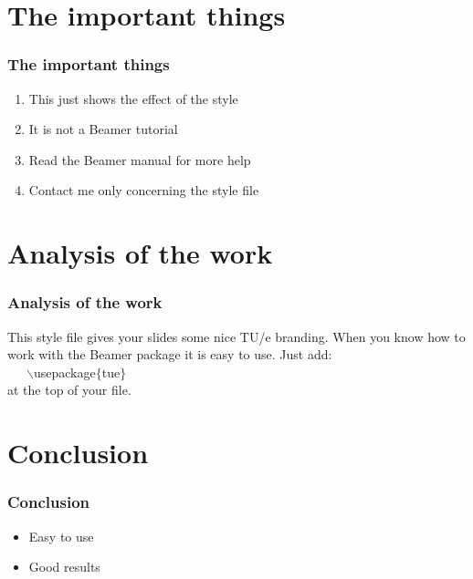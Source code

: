 \documentclass{beamer}
\begin{document}
\section{The important things}

\begin{frame}
    \frametitle{The important things}

    \begin{enumerate}
        \item This just shows the effect of the style
        \item It is not a Beamer tutorial
        \item Read the Beamer manual for more help
        \item Contact me only concerning the style file
    \end{enumerate}
\end{frame}

\section{Analysis of the work}

\begin{frame}
    \frametitle{Analysis of the work}

    This style file gives your slides some nice TU/e branding.
    When you know how to work with the Beamer package it is easy to use.
    Just add:\\ ~~~$\backslash$usepackage$\{$tue$\}$ \\ at the top of your file.
\end{frame}

\section{Conclusion}

\begin{frame}
    \frametitle{Conclusion}

    \begin{itemize}
        \item Easy to use
        \item Good results
    \end{itemize}
\end{frame}
\end{document}
